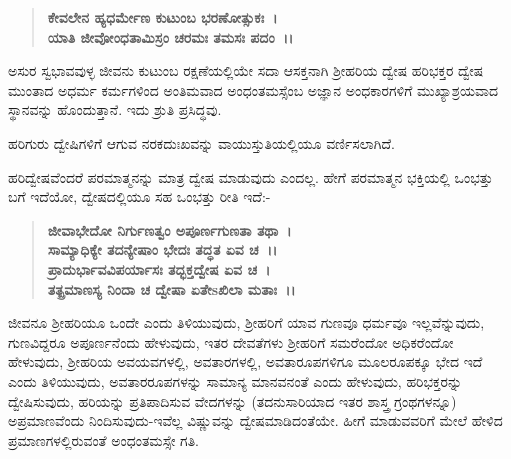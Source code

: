 \begin{verse}
\textbf{ಕೇವಲೇನ ಹ್ಯಧರ್ಮೇಣ ಕುಟುಂಬ ಭರಣೋತ್ಸುಕಃ~।}\\\textbf{ಯಾತಿ ಜೀವೋಂಧತಾಮಿಸ್ರಂ ಚರಮಃ ತಮಸಃ ಪದಂ~।।}
\end{verse}

\vspace{-.4cm}


ಅಸುರ ಸ್ವಭಾವವುಳ್ಳ ಜೀವನು ಕುಟುಂಬ ರಕ್ಷಣೆಯಲ್ಲಿಯೇ ಸದಾ ಆಸಕ್ತನಾಗಿ ಶ‍್ರೀಹರಿಯ ದ್ವೇಷ ಹರಿಭಕ್ತರ ದ್ವೇಷ ಮುಂತಾದ ಅಧರ್ಮ ಕರ್ಮಗಳಿಂದ ಅಂತಿಮವಾದ ಅಂಧಂತಮಸ್ಸೆಂಬ ಅಜ್ಞಾನ ಅಂಧಕಾರಗಳಿಗೆ ಮುಖ್ಯಾಶ್ರಯವಾದ ಸ್ಥಾನವನ್ನು ಹೊಂದುತ್ತಾನೆ. ಇದು ಶ್ರುತಿ ಪ್ರಸಿದ್ಧವು.

ಹರಿಗುರು ದ್ವೇಷಿಗಳಿಗೆ ಆಗುವ ನರಕದುಃಖವನ್ನು ವಾಯುಸ್ತುತಿಯಲ್ಲಿಯೂ ವರ್ಣಿಸಲಾಗಿದೆ.

ಹರಿದ್ವೇಷವೆಂದರೆ ಪರಮಾತ್ಮನನ್ನು ಮಾತ್ರ ದ್ವೇಷ ಮಾಡುವುದು ಎಂದಲ್ಲ. ಹೇಗೆ ಪರಮಾತ್ಮನ ಭಕ್ತಿಯಲ್ಲಿ ಒಂಭತ್ತು ಬಗೆ ಇದೆಯೋ, ದ್ವೇಷದಲ್ಲಿಯೂ ಸಹ ಒಂಭತ್ತು ರೀತಿ ಇದೆ:-

\begin{verse}
\textbf{ಜೀವಾಭೇದೋ ನಿರ್ಗುಣತ್ವಂ ಅಪೂರ್ಣಗುಣತಾ ತಥಾ~।}\\\textbf{ಸಾಮ್ಯಾಧಿಕ್ಯೇ ತದನ್ಯೇಷಾಂ ಭೇದಃ ತದ್ಧತ ಏವ ಚ~।।}\\\textbf{ಪ್ರಾದುರ್ಭಾವವಿಪರ್ಯಾಸಃ ತದ್ಭಕ್ತದ್ವೇಷ ಏವ ಚ~।}\\\textbf{ತತ್ಪ್ರಮಾಣಸ್ಯ ನಿಂದಾ ಚ ದ್ವೇಷಾ ಏತೇsಖಿಲಾ ಮತಾಃ~।।}
\end{verse}


\vskip 3pt

ಜೀವನೂ ಶ‍್ರೀಹರಿಯೂ ಒಂದೇ ಎಂದು ತಿಳಿಯುವುದು, ಶ‍್ರೀಹರಿಗೆ ಯಾವ ಗುಣವೂ ಧರ್ಮವೂ ಇಲ್ಲವೆನ್ನುವುದು, ಗುಣವಿದ್ದರೂ ಅಪೂರ್ಣನೆಂದು ಹೇಳುವುದು, ಇತರ ದೇವತೆಗಳು ಶ‍್ರೀಹರಿಗೆ ಸಮರೆಂದೋ ಅಧಿಕರೆಂದೋ ಹೇಳುವುದು, ಶ‍್ರೀಹರಿಯ ಅವಯವಗಳಲ್ಲಿ, ಅವತಾರಗಳಲ್ಲಿ, ಅವತಾರೂಪಗಳಿಗೂ ಮೂಲರೂಪಕ್ಕೂ ಭೇದ ಇದೆ ಎಂದು ತಿಳಿಯುವುದು, ಅವತಾರರೂಪಗಳನ್ನು ಸಾಮಾನ್ಯ ಮಾನವನಂತೆ ಎಂದು ಹೇಳುವುದು, ಹರಿಭಕ್ತರನ್ನು ದ್ವೇಷಿಸುವುದು, ಹರಿಯನ್ನು ಪ್ರತಿಪಾದಿಸುವ ವೇದಗಳನ್ನು (ತದನುಸಾರಿಯಾದ ಇತರ ಶಾಸ್ತ್ರ ಗ್ರಂಥಗಳನ್ನೂ) ಅಪ್ರಮಾಣವೆಂದು ನಿಂದಿಸುವುದು-ಇವೆಲ್ಲ ವಿಷ್ಣುವನ್ನು ದ್ವೇಷಮಾಡಿದಂತೆಯೇ. ಹೀಗೆ ಮಾಡುವವರಿಗೆ ಮೇಲೆ ಹೇಳಿದ ಪ್ರಮಾಣಗಳಲ್ಲಿರುವಂತೆ ಅಂಧಂತಮಸ್ಸೇ ಗತಿ.

